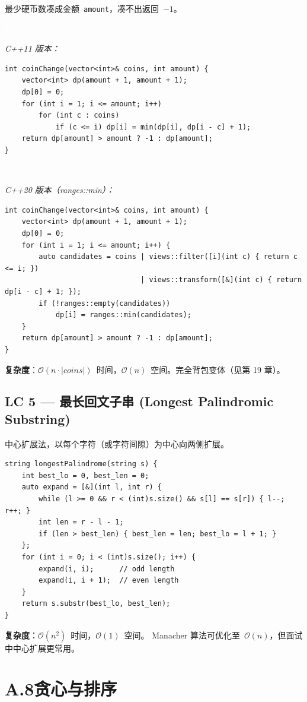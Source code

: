 \documentclass[12pt,a4paper,fontset=fandol]{ctexbook}
\newcommand{\cpplabel}{%
  \noindent\begin{tcolorbox}[sharp corners,colback=cppheadbg,colframe=cppheadbg,
    left=6pt,right=6pt,top=2pt,bottom=2pt,boxrule=0pt]
  \textcolor{white}{\small\bfseries\sffamily C++}\end{tcolorbox}%
}
\newcommand{\bigO}[1]{\mathcal{O}(#1)}
\begin{document}
最少硬币数凑成金额~\texttt{amount}，凑不出返回~$-1$。

\cpplabel\noindent\textit{C++11 版本：}
\begin{lstlisting}[style=cppstyle]
int coinChange(vector<int>& coins, int amount) {
    vector<int> dp(amount + 1, amount + 1);
    dp[0] = 0;
    for (int i = 1; i <= amount; i++)
        for (int c : coins)
            if (c <= i) dp[i] = min(dp[i], dp[i - c] + 1);
    return dp[amount] > amount ? -1 : dp[amount];
}
\end{lstlisting}

\cpplabel\noindent\textit{C++20 版本（ranges::min）：}
\begin{lstlisting}[style=cppstyle]
int coinChange(vector<int>& coins, int amount) {
    vector<int> dp(amount + 1, amount + 1);
    dp[0] = 0;
    for (int i = 1; i <= amount; i++) {
        auto candidates = coins | views::filter([i](int c) { return c <= i; })
                                | views::transform([&](int c) { return dp[i - c] + 1; });
        if (!ranges::empty(candidates))
            dp[i] = ranges::min(candidates);
    }
    return dp[amount] > amount ? -1 : dp[amount];
}
\end{lstlisting}
\textbf{复杂度}：$\bigO{n \cdot |coins|}$~时间，$\bigO{n}$~空间。完全背包变体（见第 19 章）。

\subsection*{LC 5 — 最长回文子串 (Longest Palindromic Substring)}

中心扩展法，以每个字符（或字符间隙）为中心向两侧扩展。

\begin{lstlisting}[style=cppstyle]
string longestPalindrome(string s) {
    int best_lo = 0, best_len = 0;
    auto expand = [&](int l, int r) {
        while (l >= 0 && r < (int)s.size() && s[l] == s[r]) { l--; r++; }
        int len = r - l - 1;
        if (len > best_len) { best_len = len; best_lo = l + 1; }
    };
    for (int i = 0; i < (int)s.size(); i++) {
        expand(i, i);      // odd length
        expand(i, i + 1);  // even length
    }
    return s.substr(best_lo, best_len);
}
\end{lstlisting}
\textbf{复杂度}：$\bigO{n^2}$~时间，$\bigO{1}$~空间。
Manacher 算法可优化至~$\bigO{n}$，但面试中中心扩展更常用。

\section*{A.8\quad 贪心与排序}
\end{document}
